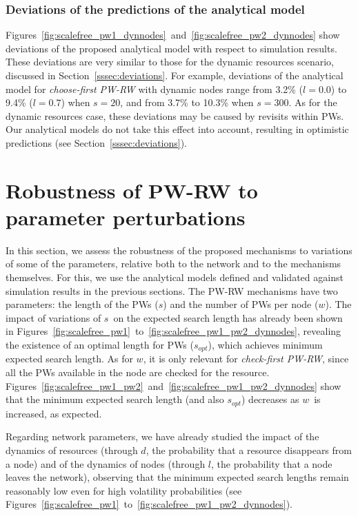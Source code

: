 \documentclass[]{elsarticle}
\newcommand{\s}		{\ensuremath{s}}		\newcommand{\sopt}	{\ensuremath{s_{opt}}}		\newcommand{\p}		{\ensuremath{p}}		\newcommand{\W}		{\ensuremath{W}}		\newcommand{\w}		{\ensuremath{w}}		\newcommand{\lsave}	{\ensuremath{\overline{l}_s}}	\newcommand{\lave}	{\ensuremath{\overline{l}}}	\newcommand{\lopt}	{\ensuremath{\overline{l}_{opt}}}
\begin{document}
\subsubsection{Deviations of the predictions of the analytical model}
\label{sssec:deviations2}

Figures~\ref{fig:scalefree_pw1_dynnodes}~and~\ref{fig:scalefree_pw2_dynnodes} show deviations of the proposed analytical model with respect to simulation results. These deviations are very similar to those for the dynamic resources scenario, discussed in Section~\ref{sssec:deviations}. For example, deviations of the analytical model for \emph{choose-first PW-RW} with dynamic nodes range from 3.2\% ($l=0.0$) to 9.4\% ($l=0.7$) when $\s=20$, and from 3.7\% to 10.3\% when $\s=300$. 
As for the dynamic resources case, these deviations may be caused by revisits within PWs. Our analytical models do not take this effect into account, resulting in optimistic predictions (see Section~\ref{sssec:deviations}). 

\section{Robustness of PW-RW to parameter perturbations}

In this section, we assess the robustness of the proposed mechanisms to variations of some of the parameters, relative both to the network and to the mechanisms themselves. For this, we use the analytical models defined and validated against simulation results in the previous sections. The PW-RW mechanisms have two parameters: the length of the PWs (\s) and the number of PWs per node (\w). The impact of variations of \s\ on the expected search length has already been shown in Figures~\ref{fig:scalefree_pw1}~to~\ref{fig:scalefree_pw1_pw2_dynnodes}, revealing the existence of an optimal length for PWs (\sopt), which achieves minimum expected search length. As for \w, it is only relevant for  \emph{check-first PW-RW}, since all the PWs available in the node are checked for the resource. Figures~\ref{fig:scalefree_pw1_pw2}~and~\ref{fig:scalefree_pw1_pw2_dynnodes} show that the minimum expected search length (and also \sopt) decreases as \w\ is increased, as expected. 

Regarding network parameters, we have already studied the impact of the dynamics of resources (through $d$, the probability that a resource disappears from a node) and of the dynamics of nodes (through $l$, the probability that a node leaves the network), observing that the minimum expected search lengths remain reasonably low even for high volatility probabilities (see Figures~\ref{fig:scalefree_pw1}~to~\ref{fig:scalefree_pw1_pw2_dynnodes}).
\end{document}
